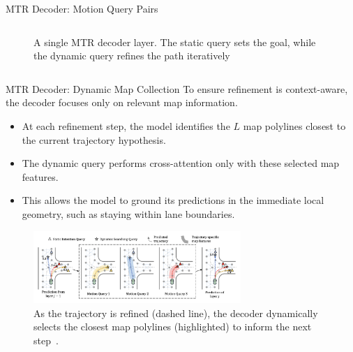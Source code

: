 \documentclass[10pt,aspectratio=169]{beamer}
\begin{document}
\begin{frame}{MTR Decoder: Motion Query Pairs}
\begin{columns}[T]
\begin{column}{0.4\textwidth}
\begin{figure}
                \caption{A single MTR decoder layer. The static query sets the goal, while the dynamic query refines the path iteratively~\cite{Shi2022MTR}}
            \end{figure}
        \end{column}
    \end{columns}
\end{frame}

\begin{frame}{MTR Decoder: Dynamic Map Collection}
    To ensure refinement is context-aware, the decoder focuses only on relevant map information.
    \begin{itemize}
        \item At each refinement step, the model identifies the $L$ map polylines closest to the current trajectory hypothesis.
        \item The dynamic query performs cross-attention only with these selected map features.
        \item This allows the model to ground its predictions in the immediate local geometry, such as staying within lane boundaries.
    \end{itemize}
    \begin{figure}
        \centering
        \includegraphics[width=0.7\textwidth]{docs/latex/figures/dynamic_map.png}
        \caption{As the trajectory is refined (dashed line), the decoder dynamically selects the closest map polylines (highlighted) to inform the next step~\cite{Shi2022MTR}.}
        \label{fig:dynamic_map_pres}
    \end{figure}
\end{frame}
\end{document}
